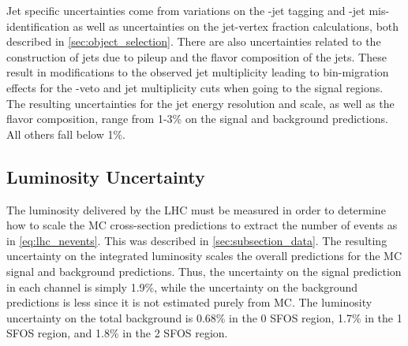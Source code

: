 Jet specific uncertainties come from variations on the \bee-jet tagging
and \bee-jet mis-identification as well as uncertainties on the jet-vertex
fraction calculations, both described in \sec\ref{sec:object_selection}. There
are also uncertainties related to the construction of jets due to pileup
and the flavor composition of the jets. These result in modifications
to the observed jet multiplicity leading to bin-migration effects 
for the \bee-veto and jet multiplicity cuts when going to the signal regions.
The resulting uncertainties for the jet energy resolution and scale, as well
as the flavor composition, range from 1-3\% on the signal and background 
predictions. All others fall below 1\%.



\subsection{Luminosity Uncertainty}
The luminosity delivered by the LHC must be measured in order to determine
how to scale the MC cross-section
predictions to extract the number of events as in \eqn\eqref{eq:lhc_nevents}.
This was described in \sec\ref{sec:subsection_data}. The resulting
uncertainty on the integrated luminosity scales the overall predictions
for the MC signal and background predictions. Thus, the uncertainty 
on the signal prediction in each channel is simply 1.9\%, while the uncertainty
on the background predictions is less since it is not estimated purely from 
MC. The luminosity uncertainty on the total background is
0.68\% in the 0 SFOS region, 1.7\% in the 1 SFOS region, 
and 1.8\% in the 2 SFOS region.
